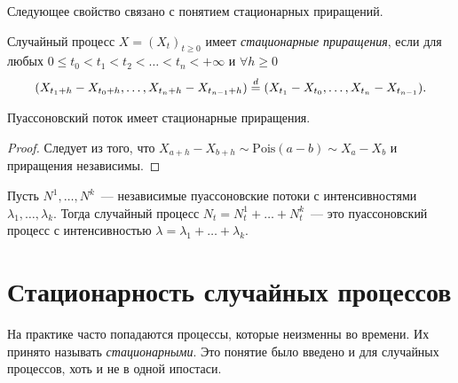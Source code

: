 Следующее свойство связано с понятием стационарных приращений.
\begin{definition}
	Случайный процесс \(X = (X_{t})_{t \geq 0}\) имеет \emph{стационарные 
	приращения}, если для любых \(0 \leq t_{0} < t_{1} < t_{2} < \ldots < 
	t_{n} < +\infty\) и \(\forall h \geq 0\) 
	\[
		(X_{t_{1} + h} - X_{t_{0} + h}, \dots, X_{t_{n} + h} - X_{t_{n - 1} + 
		h}) \overset{d}{=} (X_{t_{1}} - X_{t_{0}}, \dots, X_{t_{n}} - X_{t_{n - 1}}).
	\]
\end{definition}
\begin{property}
	Пуассоновский поток имеет стационарные приращения.
\end{property}
\begin{proof}
	Следует из того, что \(X_{a + h} - X_{b + h} \sim \mathrm{Pois}(a - b) \sim 
	X_{a} - X_{b}\) и приращения независимы.
\end{proof}

\begin{property}
	Пусть \(N^{1}, \ldots, N^{k}\)~--- независимые пуассоновские потоки с 
	интенсивностями \(\lambda_{1}, \ldots, \lambda_{k}\). Тогда случайный 
	процесс \(N_{t} = N_{t}^{1} + \ldots + N_{t}^{k}\)~--- это пуассоновский 
	процесс с интенсивностью \(\lambda = \lambda_{1} + \ldots + \lambda_{k}\).
\end{property}

\section{Стационарность случайных процессов}
На практике часто попадаются процессы, которые неизменны во времени. Их принято 
называть \emph{стационарными}. Это понятие было введено и для случайных 
процессов, хоть и не в одной ипостаси.

